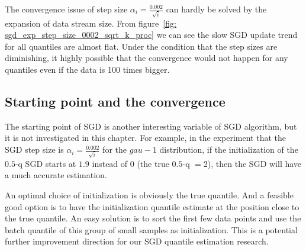 The convergence issue of step size $\alpha_i = \frac{0.002}{\sqrt{i}}$ can hardly be solved by the expansion of data stream size. From figure~\ref{fig: sgd_exp_step_size_0002_sqrt_k_proc} we can see the slow SGD update trend for all quantiles are almost flat. Under the condition that the step sizes are diminishing, it highly possible that the convergence would not happen for any quantiles even if the data is 100 times bigger.

\subsection{Starting point and the convergence}

The starting point of SGD is another interesting variable of SGD algorithm, but it is not investigated in this chapter. For example, in the experiment that the SGD step size is $\alpha_i = \frac{0.002}{\sqrt{i}}$ for the $gau-1$ distribution, if the initialization of the $0.5$-q SGD starts at $1.9$ instead of $0$ (the true $0.5$-q $=2$), then the SGD will have a much accurate estimation.

An optimal choice of initialization is obviously the true quantile. And a feasible good option is to have the initialization quantile estimate at the position close to the true quantile. An easy solution is to sort the first few data points and use the batch quantile of this group of small samples as initialization. This is a potential further improvement direction for our SGD quantile estimation research.


